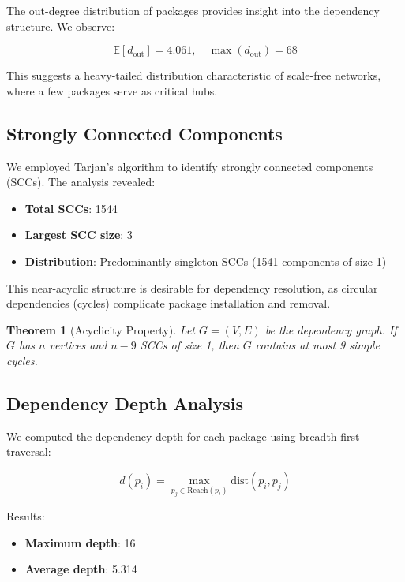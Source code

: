 \documentclass[11pt,a4paper]{article}
\newtheorem{theorem}{Theorem}
\begin{document}
The out-degree distribution of packages provides insight into the dependency structure. We observe:

\begin{equation}
\mathbb{E}[d_{\text{out}}] = 4.061, \quad \max(d_{\text{out}}) = 68
\end{equation}

This suggests a heavy-tailed distribution characteristic of scale-free networks, where a few packages serve as critical hubs.

\subsection{Strongly Connected Components}

We employed Tarjan's algorithm to identify strongly connected components (SCCs). The analysis revealed:

\begin{itemize}
\item \textbf{Total SCCs}: 1544
\item \textbf{Largest SCC size}: 3
\item \textbf{Distribution}: Predominantly singleton SCCs (1541 components of size 1)
\end{itemize}

This near-acyclic structure is desirable for dependency resolution, as circular dependencies (cycles) complicate package installation and removal.

\begin{theorem}[Acyclicity Property]
Let $G = (V, E)$ be the dependency graph. If $G$ has $n$ vertices and $n-9$ SCCs of size 1, then $G$ contains at most 9 simple cycles.
\end{theorem}

\subsection{Dependency Depth Analysis}

We computed the dependency depth for each package using breadth-first traversal:

\begin{equation}
d(p_i) = \max_{p_j \in \text{Reach}(p_i)} \text{dist}(p_i, p_j)
\end{equation}

Results:
\begin{itemize}
\item \textbf{Maximum depth}: 16
\item \textbf{Average depth}: 5.314
\end{itemize}
\end{document}

